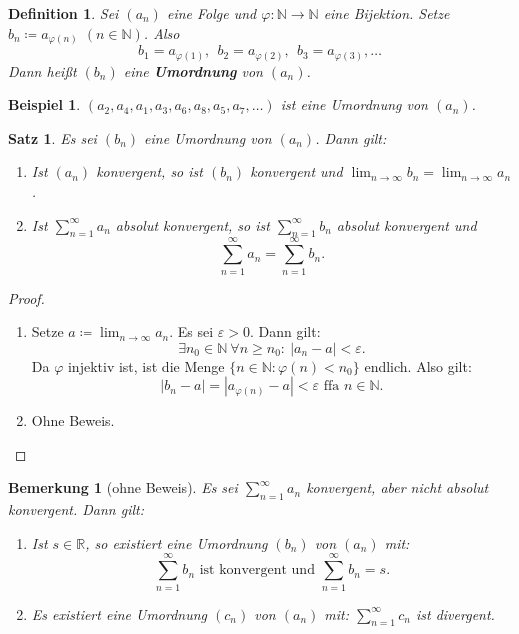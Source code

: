 \documentclass[12pt]{extreport} %
\newcommand{\N}{\mathbb{N}}
\newcommand{\R}{\mathbb{R}}
\theoremstyle{named}
\theoremstyle{itshape}
\newtheorem{satz}[unnamedtheorem]{Satz}
\newtheorem*{definition}{Definition}
\theoremstyle{normal}
\newtheorem*{beispiel*}{Beispiel}
\newtheorem*{bemerkung}{Bemerkung}
\begin{document}
\begin{definition}
	Sei $(a_{n})$ eine Folge und $\varphi \colon \N \rightarrow \N$ eine Bijektion. Setze $b_{n} \coloneqq a_{\varphi(n)}$ $(n \in \N)$. Also 
		$$ b_{1} = a_{\varphi(1)}, ~~ b_{2} = a_{\varphi(2)}, ~~ b_{3} = a_{\varphi(3)}, \dotsc $$
	Dann hei{\ss}t $(b_{n})$ eine \textbf{Umordnung} von $(a_{n})$.
\end{definition}

\begin{beispiel*}
$(a_{2}, a_{4}, a_{1}, a_{3}, a_{6}, a_{8}, a_{5}, a_{7}, \dotsc)$ ist eine Umordnung von $(a_{n})$.	
\end{beispiel*}


\begin{satz} \label{3.10:satz}
	Es sei $(b_{n})$ eine Umordnung von $(a_{n})$. Dann gilt:
	\begin{enumerate}
		\item Ist $(a_{n})$ konvergent, so ist $(b_{n})$ konvergent und $\lim_{n \to \infty} b_{n} = \lim_{n \to \infty} a_{n}$.
		\item Ist $\sum_{n=1}^{\infty} a_{n}$ absolut konvergent, so ist $\sum_{n=1}^{\infty} b_{n}$ absolut konvergent und 
			$$ \sum_{n=1}^{\infty} a_{n} = \sum_{n=1}^{\infty} b_{n}. $$
	\end{enumerate}	
\end{satz}

\begin{proof} ~\
	\begin{enumerate}
		\item Setze $a \coloneqq \lim_{n \to \infty} a_{n}$. Es sei $\varepsilon > 0$. Dann gilt: 
		$$
		\exists n_{0} \in \N ~\forall n \geq n_{0}: ~ |a_{n} - a| < \varepsilon.
		$$
		Da $\varphi$ injektiv ist, ist die Menge $\{n \in \N: \varphi(n)< n_0\}$ endlich.
		Also gilt: $$|b_n-a|=|a_{\varphi(n)} - a| < \varepsilon \text{ ffa } n \in \N.$$
		\item Ohne Beweis.
	\end{enumerate}	
\end{proof}


\begin{bemerkung}[ohne Beweis]
	Es sei $\sum_{n=1}^{\infty} a_{n}$ konvergent, aber nicht absolut konvergent. Dann gilt:
	\begin{enumerate}
		\item Ist $s \in \R$, so existiert eine Umordnung $(b_{n})$ von $(a_{n})$ mit: 
		$$
		\sum_{n=1}^{\infty} b_{n} \text{ ist konvergent und }  \sum_{n=1}^{\infty} b_{n} = s.
		$$
		\item Es existiert eine Umordnung $(c_{n})$ von $(a_{n})$ mit: $\sum_{n=1}^{\infty}c_{n}$ ist divergent.
	\end{enumerate}
\end{bemerkung}
\end{document}
